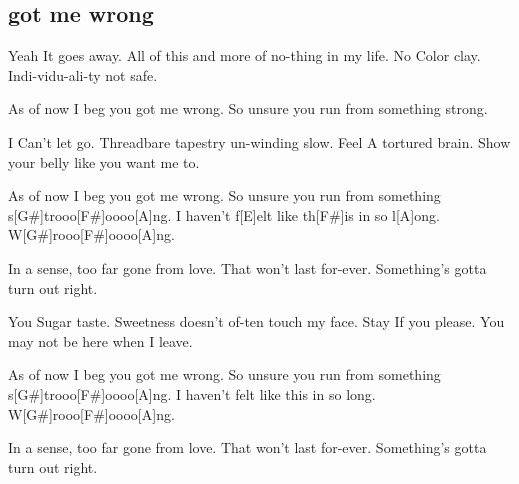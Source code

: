 \subsection*{got me wrong   }
\begin{guitar}
Yeah
It goes away.
All of this and more of no-thing in my life.
No
Color clay.
Indi-vidu-ali-ty not safe.



As of now I beg you got me wrong.
So unsure you run from something strong.



I
Can't let go.
Threadbare tapestry un-winding slow.
Feel
A tortured brain.
Show your belly like you want me to.



As of now I beg you got me wrong.
So unsure you run from something s[G\#]trooo[F\#]oooo[A]ng.
I haven't f[E]elt like th[F\#]is in so l[A]ong.
W[G\#]rooo[F\#]oooo[A]ng.



In a sense, too far gone from love.
That won't last for-ever.
Something's gotta turn out right.



You
Sugar taste.
Sweetness doesn't of-ten touch my face.
Stay
If you please.
You may not be here when I leave.



As of now I beg you got me wrong.
So unsure you run from something s[G\#]trooo[F\#]oooo[A]ng.
I haven't felt like this in so long.
W[G\#]rooo[F\#]oooo[A]ng.



In a sense, too far gone from love.
That won't last for-ever.
Something's gotta turn out right.
\end{guitar}
